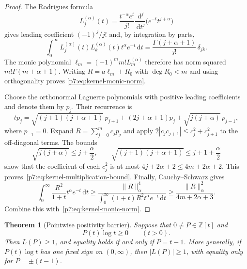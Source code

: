 \documentclass[11pt,a4paper]{article}
\newtheorem{theorem}{Theorem}[section]
\theoremstyle{definition}
\theoremstyle{remark}
\newcommand{\Z}{\mathbb Z}
\newcommand{\dd}{\,\mathrm d}
\numberwithin{equation}{section}
\begin{document}
\begin{proof}
The Rodrigues formula
\[
 L_j^{(\alpha)}(t)=
 \frac{t^{-\alpha}e^t}{j!}
 \frac{\dd^j}{\dd t^j}\bigl(e^{-t}t^{j+\alpha}\bigr)
\]
gives leading coefficient $(-1)^j/j!$ and, by integration by parts,
\[
 \int_0^\infty L_j^{(\alpha)}(t)L_k^{(\alpha)}(t)
                t^\alpha e^{-t}\dd t
 =\frac{\Gamma(j+\alpha+1)}{j!}\,\delta_{jk}.
\]
The monic polynomial $\ell_m=(-1)^m m!L_m^{(\alpha)}$ therefore has
norm squared $m!\Gamma(m+\alpha+1)$.  Writing
$R=a\ell_m+R_0$ with $\deg R_0<m$ and using orthogonality proves
\eqref{p7:eq:kernel-monic-norm}.

Choose the orthonormal Laguerre polynomials with positive leading
coefficients and denote them by $p_j$.  Their recurrence is
\[
 tp_j=\sqrt{(j+1)(j+\alpha+1)}\,p_{j+1}
      +(2j+\alpha+1)p_j+\sqrt{j(j+\alpha)}\,p_{j-1},
\]
where $p_{-1}=0$.
Expand $R=\sum_{j=0}^m c_jp_j$ and apply
$2|c_jc_{j+1}|\leq c_j^2+c_{j+1}^2$ to the off-diagonal terms.
The bounds
\[
 \sqrt{j(j+\alpha)}\leq j+\frac\alpha2,
 \qquad
 \sqrt{(j+1)(j+\alpha+1)}\leq j+1+\frac\alpha2
\]
show that the coefficient of each $c_j^2$ is at most
$4j+2\alpha+2\leq4m+2\alpha+2$.
This proves~\eqref{p7:eq:kernel-multiplication-bound}.
Finally, Cauchy--Schwarz gives
\[
 \int_0^\infty\frac{R^2}{1+t}t^\alpha e^{-t}\dd t
 \geq
 \frac{\|R\|_\alpha^4}
 {\displaystyle\int_0^\infty(1+t)R^2t^\alpha e^{-t}\dd t}
 \geq\frac{\|R\|_\alpha^2}{4m+2\alpha+3}.
\]
Combine this with~\eqref{p7:eq:kernel-monic-norm}.
\end{proof}

\begin{theorem}[Pointwise positivity barrier]\label{p7:thm:kernel-positive-gap}
Suppose that $0\ne P\in\Z[t]$ and
\[
 P(t)\log t\geq0\qquad(t>0).
\]
Then $L(P)\geq1$, and equality holds if and only if $P=t-1$.
More generally, if $P(t)\log t$ has one fixed sign on $(0,\infty)$,
then $|L(P)|\geq1$, with equality only for $P=\pm(t-1)$.
\end{theorem}
\end{document}
